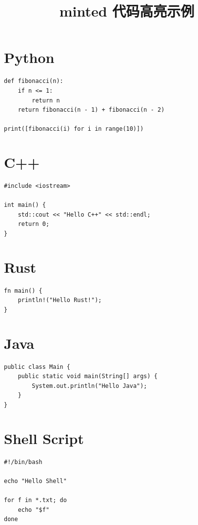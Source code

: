 \documentclass[a4paper,12pt]{article}   %
\title{minted 代码高亮示例}
\author{}
\date{}
\begin{document}
\maketitle

\section{Python}

\begin{verbatim}
def fibonacci(n):
    if n <= 1:
        return n
    return fibonacci(n - 1) + fibonacci(n - 2)

print([fibonacci(i) for i in range(10)])
\end{verbatim}

\section{C++}

\begin{verbatim}
#include <iostream>

int main() {
    std::cout << "Hello C++" << std::endl;
    return 0;
}
\end{verbatim}

\section{Rust}

\begin{verbatim}
fn main() {
    println!("Hello Rust!");
}
\end{verbatim}

\section{Java}

\begin{verbatim}
public class Main {
    public static void main(String[] args) {
        System.out.println("Hello Java");
    }
}
\end{verbatim}

\section{Shell Script}

\begin{verbatim}
#!/bin/bash

echo "Hello Shell"

for f in *.txt; do
    echo "$f"
done
\end{verbatim}
\end{document}
